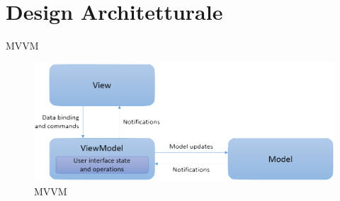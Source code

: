 \section{Design Architetturale}

\begin{frame}{MVVM}
	\begin{figure}
		\centering
		\includegraphics[scale=0.4]{img/mvvm.png}
		\caption{MVVM}
		
	\end{figure}
\end{frame}

